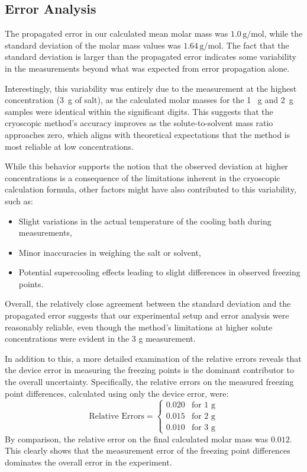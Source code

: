\documentclass[a4paper,12pt]{article}
\begin{document}
\subsection{Error Analysis}
The propagated error in our calculated mean molar mass was $1.0 \, \text{g/mol}$, while the standard deviation of the molar mass values was $1.64 \, \text{g/mol}$. The fact that the standard deviation is larger than the propagated error indicates some variability in the measurements beyond what was expected from error propagation alone.

Interestingly, this variability was entirely due to the measurement at the highest concentration (3~g of salt), as the calculated molar masses for the 1~ g and 2~g samples were identical within the significant digits. This suggests that the cryoscopic method's accuracy improves as the solute-to-solvent mass ratio approaches zero, which aligns with theoretical expectations that the method is most reliable at low concentrations.

While this behavior supports the notion that the observed deviation at higher concentrations is a consequence of the limitations inherent in the cryoscopic calculation formula, other factors might have also contributed to this variability, such as:
\begin{itemize}
    \item Slight variations in the actual temperature of the cooling bath during measurements,
    \item Minor inaccuracies in weighing the salt or solvent,
    \item Potential supercooling effects leading to slight differences in observed freezing points.
\end{itemize}

Overall, the relatively close agreement between the standard deviation and the propagated error suggests that our experimental setup and error analysis were reasonably reliable, even though the method's limitations at higher solute concentrations were evident in the 3 g measurement.


In addition to this, a more detailed examination of the relative errors reveals that the device error in measuring the freezing points is the dominant contributor to the overall uncertainty. Specifically, the relative errors on the measured freezing point differences, calculated using only the device error, were:
\[
\text{Relative Errors} = \begin{cases} 
0.020 & \text{for 1 g} \\
0.015 & \text{for 2 g} \\
0.010 & \text{for 3 g}
\end{cases}
\]
By comparison, the relative error on the final calculated molar mass was $0.012$. This clearly shows that the measurement error of the freezing point differences dominates the overall error in the experiment.
\end{document}
